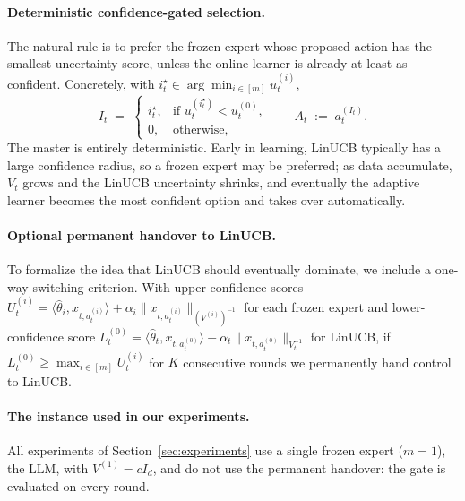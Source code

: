 \documentclass{article}
\theoremstyle{definition}
\theoremstyle{remark}
\theoremstyle{remark}
\begin{document}
\paragraph{Deterministic confidence-gated selection.}
The natural rule is to prefer the frozen expert whose proposed action
has the smallest uncertainty score, unless the online learner is
already at least as confident. Concretely, with
$i_t^\star\in\arg\min_{i\in[m]}u_t^{(i)}$,
\[
I_t \;=\;
\begin{cases}
i_t^\star, & \text{if }u_t^{(i_t^\star)}<u_t^{(0)},\\[2pt]
0, & \text{otherwise},
\end{cases}
\qquad A_t \;:=\; a_t^{(I_t)}.
\]
The master is entirely deterministic. Early in learning, LinUCB
typically has a large confidence radius, so a frozen expert may be
preferred; as data accumulate, $V_t$ grows and the LinUCB uncertainty
shrinks, and eventually the adaptive learner becomes the most confident
option and takes over automatically.

\paragraph{Optional permanent handover to LinUCB.}
To formalize the idea that LinUCB should eventually dominate, we include
a one-way switching criterion. With upper-confidence scores
$U_t^{(i)} = \langle\widehat\theta_i,x_{t,a_t^{(i)}}\rangle + \alpha_i\|x_{t,a_t^{(i)}}\|_{(V^{(i)})^{-1}}$
for each frozen expert and lower-confidence score
$L_t^{(0)} = \langle\widehat\theta_t,x_{t,a_t^{(0)}}\rangle - \alpha_t\|x_{t,a_t^{(0)}}\|_{V_t^{-1}}$
for LinUCB, if $L_t^{(0)} \ge \max_{i\in[m]} U_t^{(i)}$ for $K$
consecutive rounds we permanently hand control to LinUCB.

\paragraph{The instance used in our experiments.}
All experiments of Section~\ref{sec:experiments} use a single frozen expert
($m=1$), the LLM, with $V^{(1)}=cI_d$, and do not use the permanent handover:
the gate is evaluated on every round.
\end{document}
